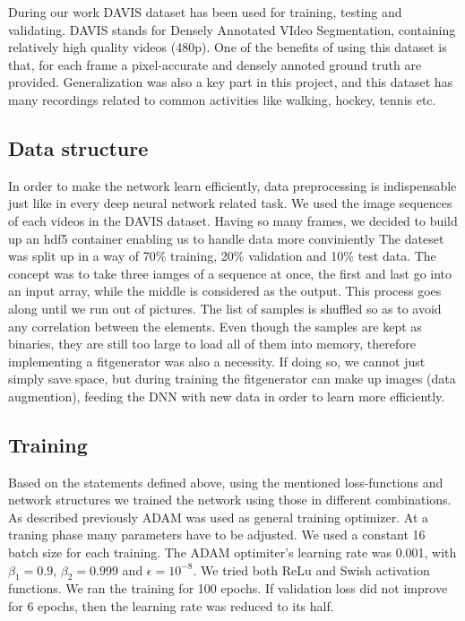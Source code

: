 \documentclass{article}
\begin{document}
During our work DAVIS dataset has been used for training, testing and validating. DAVIS stands for Densely Annotated VIdeo Segmentation, containing relatively high quality videos (480p). One of the benefits of using this dataset is that, for each frame a pixel-accurate and densely annoted ground truth are provided. Generalization was also a key part in this project, and this dataset has many recordings related to common activities like walking, hockey, tennis etc.

\subsection{Data structure}
In order to make the network learn efficiently, data preprocessing is indispensable just like in every deep neural network related task. We used the image sequences of each videos in the DAVIS dataset. Having so many frames, we decided to build up an hdf5 container enabling us to handle data more conviniently The dateset was split up in a way of 70\% training, 20\% validation and 10\% test data. The concept was to take three iamges of a sequence at once, the first and last go into an input array, while the middle is considered as the output. This process goes along until we run out of pictures. The list of samples is shuffled so as to avoid any correlation between the elements. Even though the samples are kept as binaries, they are still too large to load all of them into memory, therefore implementing a fitgenerator was also a necessity. If doing so, we cannot just simply save space, but during training the fitgenerator can make up images (data augmention), feeding the DNN with new data in order to learn more efficiently.

\subsection{Training}
Based on the statements defined above, using the mentioned loss-functions and network structures we trained the network using those in different combinations. As described previously ADAM was used as general training optimizer. At a traning phase many parameters have to be adjusted. We used a constant 16 batch size for each training. The ADAM optimiter's learning rate was 0.001, with $\beta_1 = 0.9$, $\beta_2=0.999$ and $\epsilon=10^{-8}$. We tried both ReLu and Swish activation functions. We ran the training for 100 epochs. If validation loss did not improve for 6 epochs, then the learning rate was reduced to its half.
\end{document}

